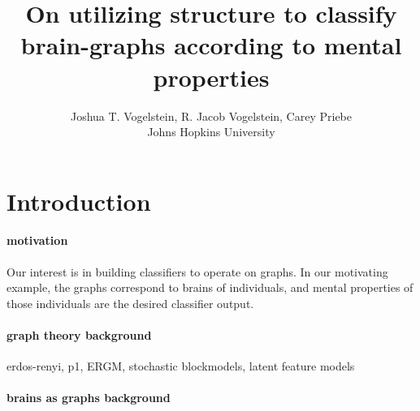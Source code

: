  
\usepackage{algorithmic} 
\usepackage{algorithm}

\newtheorem{goal}{Goal} 
\newtheorem{desid}{Desiderata} 
\newtheorem{hypo}{Hypothesis} 
\newcommand{\zz}{\mathbb{Z}} 
\newcommand{\nec}{NeCoG}
\newcommand{\MeB}{\mM \overset{\varepsilon}{{\sim}}_F \mB}

 

\title{On utilizing structure to classify brain-graphs according to mental properties}

\author{Joshua T. Vogelstein, R. Jacob Vogelstein, Carey Priebe\\{Johns Hopkins University}}



\maketitle
\begin{abstract}
\end{abstract}

\section{Introduction} %
\label{sec:introduction}


\paragraph{motivation}

Our interest is in building classifiers to operate on graphs.  In our motivating example, the graphs correspond to brains of individuals, and mental properties of those individuals are the desired classifier output.  


\paragraph{graph theory background}

erdos-renyi, p1, ERGM, stochastic blockmodels, latent feature models

\paragraph{brains as graphs background}


